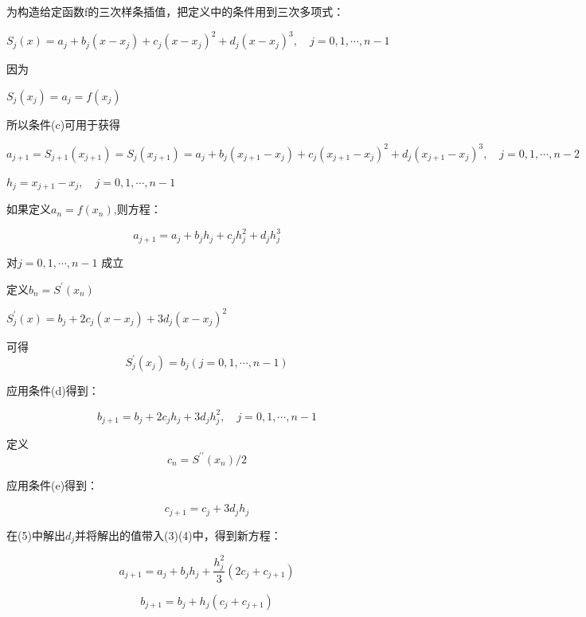 \documentclass[UTF8]{ctexart}
\begin{document}
为构造给定函数f的三次样条插值，把定义中的条件用到三次多项式：

$S_{j}(x)=a_{j}+b_{j}\left(x-x_{j}\right)+c_{j}\left(x-x_{j}\right)^{2}+d_{j}\left(x-x_{j}\right)^{3}, \quad j=0,1, \cdots, n-1$

因为

$S_{j}\left(x_{j}\right)=a_{j}=f\left(x_{j}\right)$

所以条件(c)可用于获得

$a_{j+1}=S_{j+1}\left(x_{j+1}\right)=S_{j}\left(x_{j+1}\right)=a_{j}+b_{j}\left(x_{j+1}-x_{j}\right)+c_{j}\left(x_{j+1}-x_{j}\right)^{2}+d_{j}\left(x_{j+1}-x_{j}\right)^{3}, \quad j=0,1, \cdots, n-2$

$h_{j}=x_{j+1}-x_{j}, \quad j=0,1, \cdots, n-1$

如果定义$a_n=f(x_n)$,则方程：

\begin{equation}
a_{j+1}=a_{j}+b_{j} h_{j}+c_{j} h_{j}^{2}+d_{j} h_{j}^{3}
\end{equation}

对$ j=0,1, \cdots, n-1$ 成立

定义$ b_n=S^{\prime}(x_n)$

$S_{j}^{\prime}(x)=b_{j}+2 c_{j}\left(x-x_{j}\right)+3 d_{j}\left(x-x_{j}\right)^{2}$

可得$$S_{j}^{\prime}\left(x_{j}\right)=b_{j}(j=0,1, \cdots, n-1)$$

应用条件(d)得到：

\begin{equation}
b_{j+1}=b_{j}+2 c_{j} h_{j}+3 d_{j} h_{j}^{2}, \quad j=0,1, \cdots, n-1
\end{equation}

定义$$
c_{n}=S^{\prime\prime}\left(x_{n}\right) / 2
$$

应用条件(e)得到：

\begin{equation}
c_{j+1}=c_{j}+3 d_{j} h_{j}
\end{equation}


在(5)中解出$d_j$并将解出的值带入(3)(4)中，得到新方程：

\begin{equation}
a_{j+1}=a_{j}+b_{j} h_{j}+\frac{h_{j}^{2}}{3}\left(2 c_{j}+c_{j+1}\right)
\end{equation}

\begin{equation}
b_{j+1}=b_{j}+h_{j}\left(c_{j}+c_{j+1}\right)
\end{equation}
\end{document}
